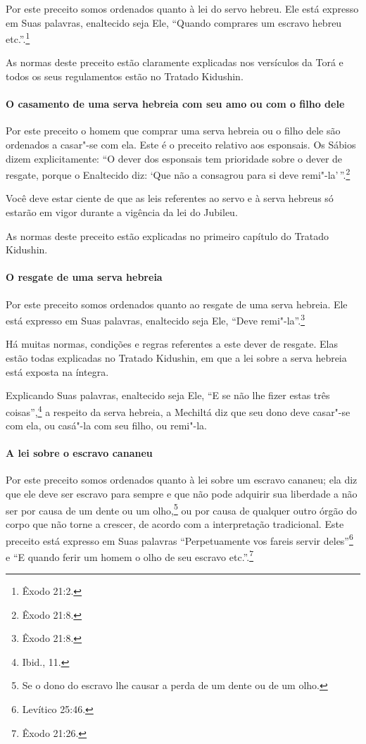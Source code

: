 \begin{multicols}{2}
Por este preceito somos ordenados quanto à lei do servo hebreu. Ele está
expresso em Suas palavras, enaltecido seja Ele, ``Quando comprares um
escravo hebreu etc.''.\footnote{Êxodo 21:2.}

As normas deste preceito estão claramente explicadas nos versículos da
Torá\starr{} e todos os seus regulamentos estão no Tratado Kidushin\starr.

\paragraph{O casamento de uma serva hebreia com seu amo ou com o filho dele}

Por este preceito o homem que comprar uma serva hebreia ou o filho dele
são ordenados a casar"-se com ela. Este é o preceito relativo aos
esponsais. Os Sábios dizem explicitamente: ``O dever dos esponsais tem
prioridade sobre o dever de resgate, porque o Enaltecido diz: `Que não a
consagrou para si deve remi"-la'\,''.\footnote{Êxodo 21:8.}

Você deve estar ciente de que as leis referentes ao servo e à serva
hebreus só estarão em vigor durante a vigência da lei do Jubileu.

As normas deste preceito estão explicadas no primeiro capítulo do
Tratado Kidushin\starr.

\paragraph{O resgate de uma serva hebreia}

Por este preceito somos ordenados quanto ao resgate de uma serva
hebreia. Ele está expresso em Suas palavras, enaltecido seja Ele, ``Deve
remi"-la''.\footnote{Êxodo 21:8.}

Há muitas normas, condições e regras referentes a este dever de
resgate. Elas estão todas explicadas no Tratado Kidushin\starr, em que a lei
sobre a serva hebreia está exposta na íntegra.

Explicando Suas palavras, enaltecido seja Ele, ``E se não lhe fizer
estas três coisas'',\footnote{Ibid., 11.} a respeito da serva hebreia, a
Mechiltá\starr{} diz que seu dono deve casar"-se com ela, ou casá"-la com seu
filho, ou remi"-la.

\paragraph{A lei sobre o escravo cananeu}

Por este preceito somos ordenados quanto à lei sobre um escravo cananeu;
ela diz que ele deve ser escravo para sempre e que não pode adquirir sua
liberdade a não ser por causa de um dente ou um
olho,\footnote{Se o dono do escravo lhe causar a perda de um dente ou de um olho.} ou por causa de qualquer outro órgão do
corpo que não torne a crescer, de acordo com a interpretação
tradicional. Este preceito está expresso em Suas palavras
``Perpetuamente vos fareis servir deles''\footnote{Levítico 25:46.} e ``E quando
ferir um homem o olho de seu escravo etc.''.\footnote{Êxodo 21:26.}


\end{multicols}
